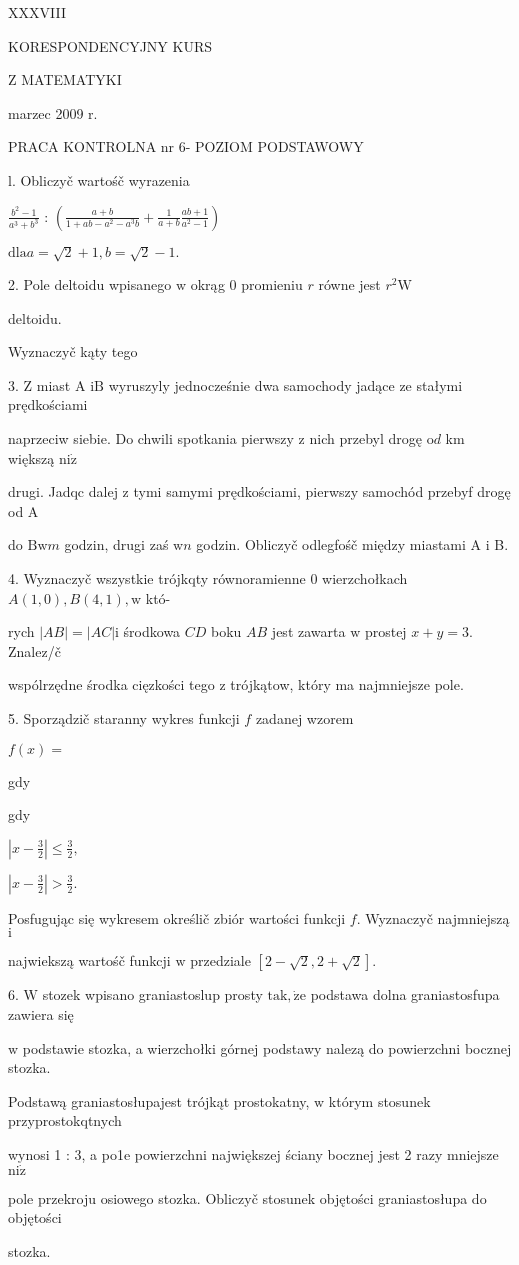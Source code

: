 \documentclass[a4paper,12pt]{article}
\begin{document}
XXXVIII

KORESPONDENCYJNY KURS

Z MATEMATYKI

marzec 2009 r.

PRACA KONTROLNA nr 6- POZIOM PODSTAWOWY

l. Obliczyč wartośč wyrazenia

$\displaystyle \frac{b^{2}-1}{a^{3}+b^{3}}$ : $(\displaystyle \frac{a+b}{1+ab-a^{2}-a^{3}b}+\frac{1}{a+b}\frac{ab+1}{a^{2}-1})$

$\mathrm{d}\mathrm{l}\mathrm{a}a=\sqrt{2}+1, b=\sqrt{2}-1.$

2. Pole deltoidu wpisanego $\mathrm{w}$ okrąg $0$ promieniu $r$ równe jest $r^{2} \mathrm{W}$

deltoidu.

Wyznaczyč kąty tego

3. $\mathrm{Z}$ miast A $\mathrm{i}\mathrm{B}$ wyruszyly jednocześnie dwa samochody jadące ze stałymi prędkościami

naprzeciw siebie. Do chwili spotkania pierwszy $\mathrm{z}$ nich przebyl drogę $\mathrm{o}d$ km większą $\mathrm{n}\mathrm{i}\dot{\mathrm{z}}$

drugi. Jadqc dalej $\mathrm{z}$ tymi samymi prędkościami, pierwszy samochód przebyf drogę od $\mathrm{A}$

do $\mathrm{B}\mathrm{w}m$ godzin, drugi zaś $\mathrm{w}n$ godzin. Obliczyč odlegfośč między miastami A $\mathrm{i}$ B.

4. Wyznaczyč wszystkie trójkqty równoramienne $0$ wierzchołkach $A(1,0), B(4,1), \mathrm{w}$ któ-

rych $|AB| = |AC| \mathrm{i}$ środkowa $CD$ boku $AB$ jest zawarta $\mathrm{w}$ prostej $x+y=3$. Znalez/č

wspólrzędne środka cięzkości tego $\mathrm{z}$ trójkątow, który ma najmniejsze pole.

5. Sporządzič staranny wykres funkcji $f$ zadanej wzorem

$f(x)=$

gdy

gdy

$|x-\displaystyle \frac{3}{2}|\leq\frac{3}{2},$

$|x-\displaystyle \frac{3}{2}|>\frac{3}{2}.$

Posfugując się wykresem określič zbiór wartości funkcji $f$. Wyznaczyč najmniejszą $\mathrm{i}$

najwiekszą wartośč funkcji $\mathrm{w}$ przedziale $[2-\sqrt{2},2+\sqrt{2}].$

6. $\mathrm{W}$ stozek wpisano graniastoslup prosty $\mathrm{t}\mathrm{a}\mathrm{k}, \dot{\mathrm{z}}\mathrm{e}$ podstawa dolna graniastosfupa zawiera się

$\mathrm{w}$ podstawie stozka, a wierzchołki górnej podstawy nalezą do powierzchni bocznej stozka.

Podstawą graniastosłupajest trójkąt prostokatny, $\mathrm{w}$ którym stosunek przyprostokqtnych

wynosi 1 : 3, a po1e powierzchni największej ściany bocznej jest 2 razy mniejsze $\mathrm{n}\mathrm{i}\dot{\mathrm{z}}$

pole przekroju osiowego stozka. Obliczyč stosunek objętości graniastosłupa do objętości

stozka.
\end{document}
